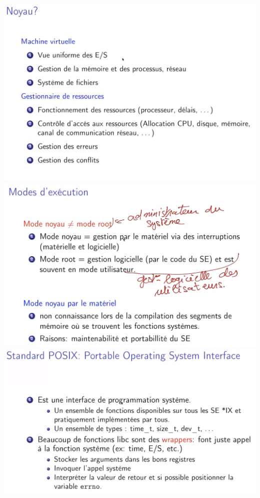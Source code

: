 \documentclass{article}
\begin{document}
    \includegraphics{9.PNG}
    \includegraphics{10.PNG}
    \includegraphics{11.PNG}
\end{document}
